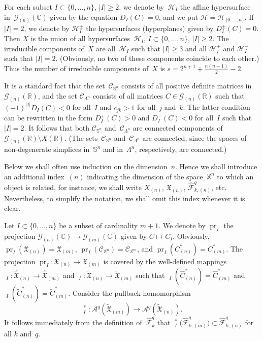 \documentclass[reqno,tbtags,12pt]{amsart}
\numberwithin{equation}{section}
\newcommand{\R}{\mathbb{R}}
\newcommand{\CH}{\mathcal{H}}
\newcommand{\CC}{\mathcal{C}}
\newcommand{\C}{\mathbb{C}}
\newcommand{\X}{\mathbb{X}}
\newcommand{\FX}{\mathfrak{X}}
\newcommand{\tFX}{\widetilde{\mathfrak{X}}}
\newcommand{\hFX}{\widehat{\mathfrak{X}}}
\newcommand{\hCF}{\widehat{\mathcal{F}}}
\newcommand{\bS}{\mathbb{S}}
\newcommand{\A}{\mathcal{A}}
\newcommand{\CG}{\mathcal{G}}
\newcommand{\tC}{\widetilde{C}}
\newcommand{\hC}{\widehat{C}}
\newcommand{\pr}{\mathop{\mathrm{pr}}\nolimits}
\newcommand{\tpr}{\mathop{\widetilde{\mathrm{pr}}}\nolimits}
\newcommand{\hpr}{\mathop{\widehat{\mathrm{pr}}}\nolimits}
\theoremstyle{definition}
\begin{document}
For each subset $I\subset \{0,\ldots,n\}$, $|I|\ge 2$, we denote by~$\CH_I$ the affine hypersurface in~$\CG_{(n)}(\C)$ given by the equation $D_I(C)=0$, and we put $\CH=\CH_{\{0,\ldots, n\}}$.
If $|I|=2$, we denote by $\CH_I^{\pm}$ the hypersurfaces (hyperplanes) given by $D_I^{\pm}(C)=0$. Then $X$ is the union of all hypersurfaces~$\CH_I$, $I\subset \{0,\ldots,n\}$, $|I|\ge 2$. The irreducible components of~$X$ are all~$\CH_I$ such that $|I|\ge 3$ and all $\CH_I^+$ and $\CH_I^-$ such that $|I|=2$. (Obviously, no two of these components coincide to each other.) Thus the number of irreducible components of~$X$ is $s=2^{n+1}+\frac{n(n-1)}{2}-2$.

 It is a standard fact that the set~$\CC_{\bS^n}$ consists of all positive definite matrices in~$\CG_{(n)}(\R)$, and the set $\CC_{\Lambda^n}$ consists of all matrices $C\in\CG_{(n)}(\R)$ such that $(-1)^{|I|}D_I(C)<0$ for all~$I$ and $c_{jk}>1$ for all~$j$ and~$k$. The latter condition can be rewritten in the form $D_I^+(C)>0$  and $D_I^-(C)<0$ for all~$I$ such that $|I|=2$. It follows that both $\CC_{\bS^n}$ and~$\CC_{\Lambda^n}$ are connected components of $\CG_{(n)}(\R)\setminus X(\R)$. (The sets~$\CC_{\bS^n}$ and~$\CC_{\Lambda^n}$ are connected, since the spaces of non-degenerate simplices in~$\bS^n$ and in~$\Lambda^n$, respectively, are connected.)




Below we shall often use  induction on the dimension~$n$. Hence we  shall introduce  an additional index~$(n)$ indicating the dimension of the space~$\X^n$ to which an object is related, for instance, we shall write $X_{(n)}$, $\FX_{(n)}$, $\hCF_{k,(n)}^q$, etc. Nevertheless, to simplify the notation, we shall omit this index whenever it is clear. 

Let $I\subset\{0,\ldots,n\}$ be a subset of cardinality $m+1$. We denote by $\pr_I$ the projection $\CG_{(n)}(\C)\to \CG_{(m)}(\C)$ given by  $C\mapsto C_I$. Obviously, $\pr_I(\FX_{(n)})=\FX_{(m)}$, $\pr_I(\CC_{\X^n})=\CC_{\X^m}$, and $\pr_I(C^*_{(n)})=C^*_{(m)}$. The projection $\pr_I\colon\FX_{(n)}\to\FX_{(m)}$ is covered by the well-defined mappings $\hpr_I\colon \hFX_{(n)}\to\hFX_{(m)}$ and $\tpr_I\colon\tFX_{(n)}\to\tFX_{(m)}$ such that $\hpr_I(\hC^*_{(n)})=\hC^*_{(m)}$ and $\tpr_I(\tC^*_{(n)})=\tC^*_{(m)}$. Consider the pullback  homomorphism $$\tpr_I^*\colon\A^q(\tFX_{(m)})\to\A^q(\tFX_{(n)}).$$ It follows immediately from the definition of~$\hCF^q_k$ that $\tpr_I^*\bigl(\hCF^q_{k,(m)}\bigr)\subset\hCF^q_{k,(n)}$ for all $k$ and~$q$.
\end{document}
